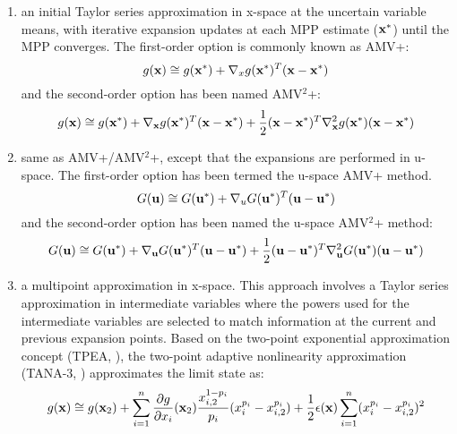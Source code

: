 \begin{enumerate}
\item an initial Taylor series approximation in x-space at the uncertain 
variable means, with iterative expansion updates at each MPP estimate
(${\bf x}^*$) until the MPP converges.  The first-order option is
commonly known as AMV+:
\begin{equation}
g({\bf x}) \cong g({\bf x}^*) + \nabla_x g({\bf x}^*)^T ({\bf x} - {\bf x}^*)
\label{eq:linear_x_mpp}
\end{equation}
and the second-order option has been named AMV$^2$+:
\begin{equation}
g({\bf x}) \cong g({\bf x}^*) + \nabla_{\bf x} g({\bf x}^*)^T 
({\bf x} - {\bf x}^*) + \frac{1}{2} ({\bf x} - {\bf x}^*)^T 
\nabla^2_{\bf x} g({\bf x}^*) ({\bf x} - {\bf x}^*) \label{eq:taylor2_x_mpp}
\end{equation}

\item same as AMV+/AMV$^2$+, except that the expansions are performed in 
u-space.  The first-order option has been termed the u-space AMV+ method.
\begin{equation}
G({\bf u}) \cong G({\bf u}^*) + \nabla_u G({\bf u}^*)^T ({\bf u} - {\bf u}^*)
\label{eq:linear_u_mpp}
\end{equation}
and the second-order option has been named the u-space AMV$^2$+ method:
\begin{equation}
G({\bf u}) \cong G({\bf u}^*) + \nabla_{\bf u} G({\bf u}^*)^T 
({\bf u} - {\bf u}^*) + \frac{1}{2} ({\bf u} - {\bf u}^*)^T 
\nabla^2_{\bf u} G({\bf u}^*) ({\bf u} - {\bf u}^*) \label{eq:taylor2_u_mpp}
\end{equation}

\item a multipoint approximation in x-space. This approach involves a 
Taylor series approximation in intermediate variables where the powers
used for the intermediate variables are selected to match information at
the current and previous expansion points.  Based on the 
two-point exponential approximation concept (TPEA, \cite{Fad90}), the 
two-point adaptive nonlinearity approximation (TANA-3, \cite{Xu98})
approximates the limit state as:
\begin{equation}
g({\bf x}) \cong g({\bf x}_2) + \sum_{i=1}^n 
\frac{\partial g}{\partial x_i}({\bf x}_2) \frac{x_{i,2}^{1-p_i}}{p_i} 
(x_i^{p_i} - x_{i,2}^{p_i}) + \frac{1}{2} \epsilon({\bf x}) \sum_{i=1}^n 
(x_i^{p_i} - x_{i,2}^{p_i})^2 \label{eq:tana_g}
\end{equation}


\end{enumerate}
